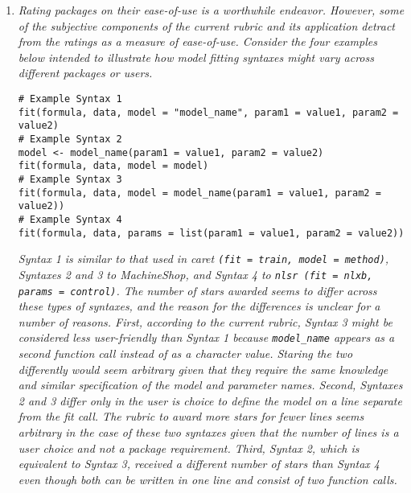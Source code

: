 \documentclass[12pt]{article}
\newcommand{\code}{\texttt}
\begin{document}
\begin{enumerate}
\textbf{}

\item \textit{Rating packages on their ease-of-use is a worthwhile endeavor.  However, some of the subjective components of the current rubric and its application detract from the ratings as a measure of ease-of-use.  Consider the four examples below intended to illustrate how model fitting syntaxes might vary across different packages or users.
}

\begin{verbatim}
# Example Syntax 1
fit(formula, data, model = "model_name", param1 = value1, param2 = value2)
# Example Syntax 2
model <- model_name(param1 = value1, param2 = value2)
fit(formula, data, model = model)
# Example Syntax 3
fit(formula, data, model = model_name(param1 = value1, param2 = value2))
# Example Syntax 4
fit(formula, data, params = list(param1 = value1, param2 = value2))
\end{verbatim}

\textit{
Syntax 1 is similar to that used in caret \code{(fit = train, model = method)}, Syntaxes 2 and 3 to MachineShop, and Syntax 4 to \code{nlsr (fit = nlxb, params = control)}.  The number of stars awarded seems to differ across these types of syntaxes, and the reason for the differences is unclear for a number of reasons.  
First, according to the current rubric, Syntax 3 might be considered less user-friendly than Syntax 1 because \code{model\_name} 
appears as a second function call instead of as a character value.  
Staring the two differently would seem arbitrary given that they require the same knowledge and similar specification of the model 
and parameter names.  Second, Syntaxes 2 and 3 differ only in the user is choice to define the model on a line separate from the fit call.  
The rubric to award more stars for fewer lines seems arbitrary in the case of these two syntaxes given that the number of lines is 
a user choice and not a package requirement.  
Third, Syntax 2, which is equivalent to Syntax 3, received a different number of stars than Syntax 4 even though both can be written in one line and consist of two function calls.
}


\end{enumerate}
\end{document}
